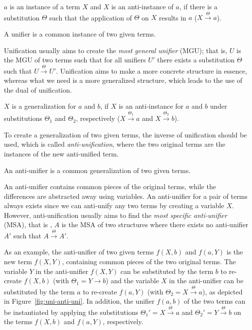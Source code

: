 \begin{defn}\label{def:instance}
$a$ is an instance of a term $X$ and $X$ is an anti-instance of $a$, if there is a substitution $\Theta$ such that the application of $\Theta$ on $X$ results in $a$ ($X\xrightarrow{\Theta}a$).
\end{defn}

\begin{defn}[Unifier]\label{def:unifier}
A unifier is a common instance of two given terms.
\end{defn}

Unification usually aims to create the \emph{most general unifier} (MGU); that is, $U$ is the MGU of two terms such that for all unifiers $U'$ there exists a substitution $\Theta$ such that $U\xrightarrow{\Theta}U'$. Unification aims to make a more concrete structure in essence, whereas what we need is a more generalized structure, which leads to the use of the dual of unification. 

\begin{defn}[Generalization]\label{def:generalization}
$X$ is a generalization for $a$ and $b$, if $X$ is an anti-instance for $a$ and $b$ under substitutions $\Theta_1$ and $\Theta_2$, respectively ($X\xrightarrow{\Theta_1}a$ and $X\xrightarrow{\Theta_2}b$).
\end{defn}
To create a generalization of two given terms, the inverse of unification should be used, which is called \emph{anti-unification}, where the two original terms are the instances of the new anti-unified term.

\begin{defn}\label{def:anti-unifier}
An anti-unifier is a common generalization of two given terms.
\end{defn}

An anti-unifier contains common pieces of the original terms, while the differences are abstracted away using variables. An anti-unifier for a pair of terms always exists since we can anti-unify any two terms by creating a variable $X$. However, anti-unification usually aims to find the \emph{most specific anti-unifier} (MSA), that is , $A$ is the MSA of two structures where there exists no anti-unifier $A'$ such that $A\xrightarrow{\Theta}A'$.

As an example, the anti-unifier of two given terms $f(X,b)$ and $f(a,Y)$ is the new term $f(X,Y)$, containing common pieces of the two original terms. The variable $Y$ in the anti-unifier $f(X,Y)$ can be substituted by the term $b$ to re-create $f(X,b)$ (with $\Theta_1 = Y\xrightarrow{}b$) and the variable $X$ in the anti-unifier can be substituted by the term $a$ to re-create $f(a,Y)$
(with $\Theta_2 = X\xrightarrow{\Theta}a$), as depicted in Figure~\ref{fig:uni-anti-uni}.
In addition, the unifier $f(a,b)$ of the two terms can be instantiated by applying the substitutions $\Theta_1'=X\xrightarrow{\Theta}a$ and $\Theta_2'=Y\xrightarrow{\Theta}b$ on the terms $f(X,b)$ and $f(a,Y)$, respectively.

